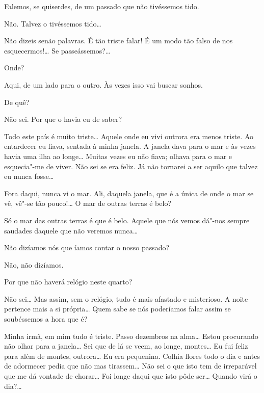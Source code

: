  Falemos, se quiserdes, de um passado
que não tivéssemos tido.

 Não. Talvez o tivéssemos tido\ldots{}

 Não dizeis senão palavras.
É tão triste falar! É um modo tão
falso de nos esquecermos!\ldots{} Se passeássemos?\ldots{}

 Onde?

 Aqui, de um lado para o outro. Às vezes isso vai buscar
sonhos.

 De quê?

 Não sei. Por que o havia eu de saber?

\hfill{} 

 Todo este país é muito triste\ldots{} 
Aquele onde eu vivi outrora
era menos triste. Ao entardecer eu fiava, 
sentada à minha janela. A janela dava para o mar
e às vezes havia uma ilha ao longe\ldots{} Muitas
vezes eu não fiava; olhava para o mar e esquecia"-me
de viver. Não sei se era feliz. Já não tornarei a ser
aquilo que talvez eu nunca fosse\ldots{}

 Fora daqui, nunca vi o mar.
Ali, daquela janela, que é a
única de onde o mar se vê, vê"-se tão pouco!\ldots{} 
O mar de outras terras é belo?

 Só o mar das outras terras é que é belo.
Aquele que nós vemos
dá"-nos sempre saudades daquele que não veremos nunca\ldots{}

\hfill{} 

 Não dizíamos nós que íamos contar o nosso passado?

 Não, não dizíamos.

 Por que não haverá relógio neste quarto?

 Não sei\ldots{} Mas assim, sem o relógio,
tudo é mais afastado e
misterioso. A noite pertence mais a si própria\ldots{} 
Quem sabe se nós
poderíamos falar assim se soubéssemos a hora que é?

 Minha irmã, em mim tudo é triste.
Passo dezembros na alma\ldots{}
Estou procurando não olhar para a janela\ldots{}
Sei que de lá se veem, ao longe, montes\ldots{}
Eu fui feliz para além de montes, outrora\ldots{} Eu era
pequenina. Colhia flores todo o dia e antes de 
adormecer pedia que não mas tirassem\ldots{}
Não sei o que isto tem de irreparável que me dá vontade
de chorar\ldots{} Foi longe daqui que isto pôde
ser\ldots{} Quando virá o dia?\ldots{}

